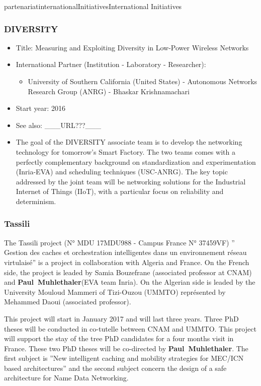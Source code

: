 \documentclass{ra2016}
\newcommand{\paul}             {\textbf{Paul~Muhlethaler}}
\begin{document}
\begin{module}{partenariat}{internationalInitiatives}{International Initiatives}
\subsubsection{DIVERSITY}
\begin{itemize}
 \item Title: Measuring and Exploiting Diversity in Low-Power Wireless Networks
 \item International Partner (Institution -  Laboratory - Researcher):
 \begin{itemize}
    \item University of Southern California (United States)  
 - Autonomous Networks Research Group (ANRG) - Bhaskar Krishnamachari
 \end{itemize}
 \item Start year: 2016\item See also: \_\_\_URL???\_\_\_
 \item The goal of the DIVERSITY associate team is to develop the networking technology for tomorrow's Smart Factory. The two teams comes with a perfectly complementary background on standardization and experimentation (Inria-EVA) and scheduling techniques (USC-ANRG). The key topic addressed by the joint team will be networking solutions for the Industrial Internet of Things (IIoT), with a particular focus on reliability and determinism. 
\end{itemize}

\subsubsection{Tassili}

The Tassili project (N° MDU 17MDU988  - Campus France  N° 37459VF) '' Gestion des caches et orchestration intelligentes dans un environnement réseau virtulaisé'' is a project in collaboration with Algeria and France. On the 
French side, the project is leaded by Samia Bouzefrane (associated professor at CNAM) and \paul (EVA team Inria). 
On the Algerian side is leaded by the University Mouloud Mammeri of Tizi-Ouzou (UMMTO) représented by Mehammed Daoui (associated professor).

This project will start in January 2017 and will last three years. Three PhD theses will be conducted in co-tutelle 
between CNAM and UMMTO. This project will support the stay of the tree PhD candidates for  a four months 
visit in France. These two PhD theses will be co-directed by \paul. The first subject is ''New intelligent caching and mobility strategies for MEC/ICN based architectures'' and the second subject concern the design of a safe  architecture for Name Data Networking. 



\end{module}
\end{document}
